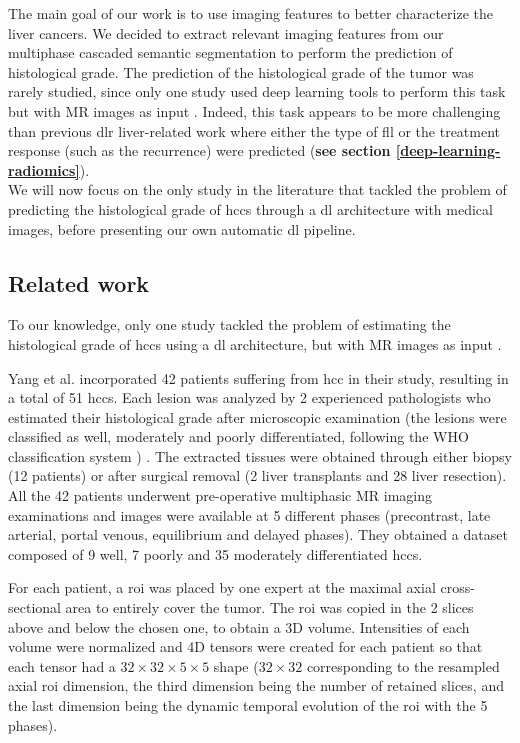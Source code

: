 The main goal of our work is to use imaging features to better characterize the liver cancers.
We decided to extract relevant imaging features from our multiphase cascaded semantic segmentation
to perform the prediction of histological grade.
The prediction of the histological grade of the tumor was rarely studied, since only one study
used deep learning tools to perform this task but with MR images as
input \cite{Yang2019}.
Indeed, this task appears to be more challenging than previous \ac{dlr}
liver-related work where either the type of \ac{fll} or the treatment
response (such as the recurrence) were predicted (\textbf{see section \ref{deep-learning-radiomics}}).\\
We will now focus on the only study in the literature that tackled the
problem of predicting the histological grade of \ac{hcc}s through a \ac{dl}
architecture with medical images, before presenting our own automatic \ac{dl}
pipeline.

\subsection{Related work}\label{dlr-based-study-to-predict-the-histological-hcc-grade}

To our knowledge, only one study tackled the problem of estimating the
histological grade of \ac{hcc}s using a \ac{dl} architecture, but with MR images
as input \cite{Yang2019}.

Yang et al. incorporated 42 patients suffering from \ac{hcc} in their study,
resulting in a total of 51 \ac{hcc}s. Each lesion was analyzed by 2
experienced pathologists who estimated their histological grade after
microscopic examination (the lesions were classified as well, moderately
and poorly differentiated, following the WHO classification system \cite{20113051318}) .
The extracted tissues were obtained through either biopsy (12 patients)
or after surgical removal (2 liver transplants and 28 liver resection).
All the 42 patients underwent pre-operative multiphasic MR imaging
examinations and images were available at 5 different phases
(precontrast, late arterial, portal venous, equilibrium and delayed
phases). They obtained a dataset composed of 9 well, 7 poorly and 35 moderately
differentiated \ac{hcc}s.

For each patient, a \ac{roi} was placed by one expert at the maximal axial
cross-sectional area to entirely cover the tumor. The \ac{roi} was
copied in the 2 slices above and below the chosen one, to obtain a 3D
volume. Intensities of each volume were normalized and 4D tensors were
created for each patient so that each tensor had a $ 32\times32\times5\times5 $ shape
($ 32\times32 $ corresponding to the resampled axial \ac{roi} dimension, the third
dimension being the number of retained slices, and the last dimension being the
dynamic temporal evolution of the \ac{roi} with the 5 phases).


